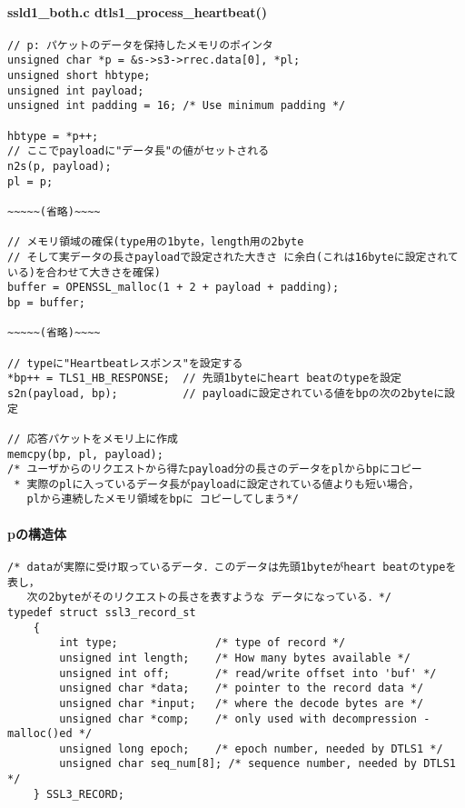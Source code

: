 \paragraph{ssl\/d1\_both.c dtls1\_process\_heartbeat()}
\begin{verbatim}
// p: パケットのデータを保持したメモリのポインタ
unsigned char *p = &s->s3->rrec.data[0], *pl;
unsigned short hbtype;
unsigned int payload;
unsigned int padding = 16; /* Use minimum padding */

hbtype = *p++;
// ここでpayloadに"データ長"の値がセットされる
n2s(p, payload);
pl = p;

~~~~~(省略)~~~~

// メモリ領域の確保(type用の1byte，length用の2byte
// そして実データの長さpayloadで設定された大きさ に余白(これは16byteに設定されている)を合わせて大きさを確保)
buffer = OPENSSL_malloc(1 + 2 + payload + padding);
bp = buffer;

~~~~~(省略)~~~~

// typeに"Heartbeatレスポンス"を設定する
*bp++ = TLS1_HB_RESPONSE;  // 先頭1byteにheart beatのtypeを設定
s2n(payload, bp);          // payloadに設定されている値をbpの次の2byteに設定

// 応答パケットをメモリ上に作成
memcpy(bp, pl, payload);
/* ユーザからのリクエストから得たpayload分の長さのデータをplからbpにコピー
 * 実際のplに入っているデータ長がpayloadに設定されている値よりも短い場合，
   plから連続したメモリ領域をbpに コピーしてしまう*/
\end{verbatim}

\paragraph{pの構造体}
\begin{verbatim}
/* dataが実際に受け取っているデータ．このデータは先頭1byteがheart beatのtypeを表し，
   次の2byteがそのリクエストの長さを表すような データになっている．*/
typedef struct ssl3_record_st
    {
        int type;               /* type of record */
        unsigned int length;    /* How many bytes available */
        unsigned int off;       /* read/write offset into 'buf' */
        unsigned char *data;    /* pointer to the record data */
        unsigned char *input;   /* where the decode bytes are */
        unsigned char *comp;    /* only used with decompression - malloc()ed */
        unsigned long epoch;    /* epoch number, needed by DTLS1 */
        unsigned char seq_num[8]; /* sequence number, needed by DTLS1 */
    } SSL3_RECORD;
\end{verbatim}

